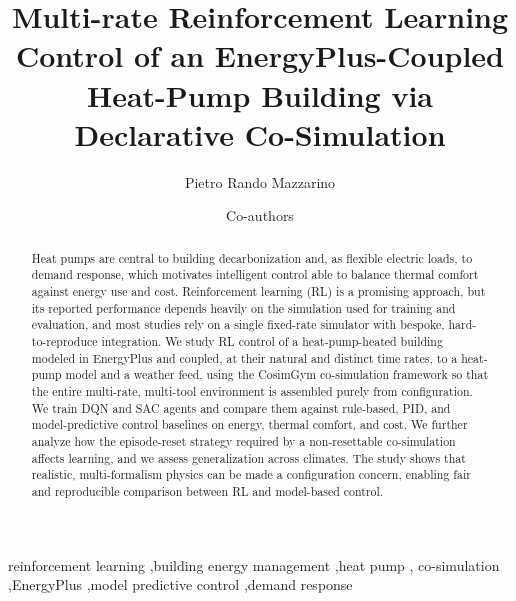 \documentclass[preprint,review,12pt]{elsarticle}
\begin{document}
\begin{frontmatter}

\title{Multi-rate Reinforcement Learning Control of an EnergyPlus-Coupled\\
Heat-Pump Building via Declarative Co-Simulation}

\author[polito]{Pietro Rando Mazzarino}
\author[polito]{Co-authors}
\address[polito]{EC-Lab, Politecnico di Torino, Turin, Italy}

\begin{abstract}
Heat pumps are central to building decarbonization and, as flexible electric
loads, to demand response, which motivates intelligent control able to balance
thermal comfort against energy use and cost. Reinforcement learning (RL) is a
promising approach, but its reported performance depends heavily on the simulation
used for training and evaluation, and most studies rely on a single fixed-rate
simulator with bespoke, hard-to-reproduce integration. We study RL control of a
heat-pump-heated building modeled in EnergyPlus and coupled, at their natural and
distinct time rates, to a heat-pump model and a weather feed, using the CosimGym
co-simulation framework so that the entire multi-rate, multi-tool environment is
assembled purely from configuration. We train DQN and SAC agents and compare them
against rule-based, PID, and model-predictive control baselines on energy, thermal
comfort, and cost.
We further analyze how the episode-reset strategy required by a non-resettable
co-simulation affects learning, and we assess generalization across climates. The
study shows that realistic, multi-formalism physics can be made a configuration
concern, enabling fair and reproducible comparison between RL and model-based
control.
\end{abstract}


\begin{keyword}
reinforcement learning \sep building energy management \sep heat pump \sep
co-simulation \sep EnergyPlus \sep model predictive control \sep demand response
\end{keyword}
\end{frontmatter}
\end{document}
